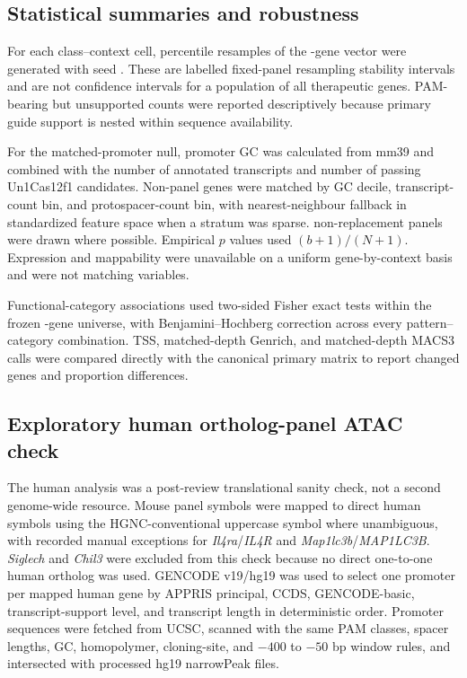 \documentclass[11pt]{article}
\begin{document}
\subsection{Statistical summaries and robustness}

For each class--context cell, \NPermutationResamplesFormatted{} percentile resamples of the \NPanel{}-gene vector were generated with seed \PermutationSeed{}. These are labelled fixed-panel resampling stability intervals and are not confidence intervals for a population of all therapeutic genes. PAM-bearing but unsupported counts were reported descriptively because primary guide support is nested within sequence availability.

For the matched-promoter null, promoter GC was calculated from mm39 and combined with the number of annotated transcripts and number of passing Un1Cas12f1 candidates. Non-panel genes were matched by GC decile, transcript-count bin, and protospacer-count bin, with nearest-neighbour fallback in standardized feature space when a stratum was sparse. \NPermutationResamplesFormatted{} non-replacement panels were drawn where possible. Empirical $p$ values used $(b+1)/(N+1)$. Expression and mappability were unavailable on a uniform gene-by-context basis and were not matching variables.

Functional-category associations used two-sided Fisher exact tests within the frozen \NPanel{}-gene universe, with Benjamini--Hochberg correction across every pattern--category combination. TSS, matched-depth Genrich, and matched-depth MACS3 calls were compared directly with the canonical primary matrix to report changed genes and proportion differences.

\subsection{Exploratory human ortholog-panel ATAC check}

The human analysis was a post-review translational sanity check, not a second genome-wide resource. Mouse panel symbols were mapped to direct human symbols using the HGNC-conventional uppercase symbol where unambiguous, with recorded manual exceptions for \textit{Il4ra}/\textit{IL4R} and \textit{Map1lc3b}/\textit{MAP1LC3B}. \textit{Siglech} and \textit{Chil3} were excluded from this check because no direct one-to-one human ortholog was used. GENCODE v19/hg19 was used to select one promoter per mapped human gene by APPRIS principal, CCDS, GENCODE-basic, transcript-support level, and transcript length in deterministic order. Promoter sequences were fetched from UCSC, scanned with the same PAM classes, spacer lengths, GC, homopolymer, cloning-site, and $-400$ to $-50$ bp window rules, and intersected with processed hg19 narrowPeak files.
\end{document}
